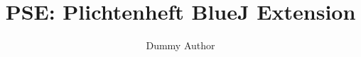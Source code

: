 \begin{titlepage}
  
  \title{PSE: Plichtenheft BlueJ Extension}
  \author{Dummy Author}
  \maketitle

\end{titlepage}